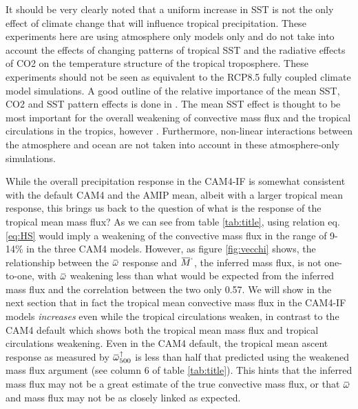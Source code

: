 \documentclass[letterpaper,12pt,titlepage,oneside,final]{book}
\newcommand{\overbar}[1]{\mkern 1.5mu\overline{\mkern-1.5mu#1\mkern-1.5mu}\mkern 1.5mu}
\begin{document}
It should be very clearly noted that a uniform increase in SST is not the only effect of climate change that will influence tropical precipitation. These experiments here are using atmosphere only models only and do not take into account the effects of changing patterns of tropical SST and the radiative effects of CO2 on the temperature structure of the tropical troposphere. These experiments should not be seen as equivalent to the RCP8.5 fully coupled climate model simulations. A good outline of the relative importance of the mean SST, CO2 and SST pattern effects is done in \citep{he_anthropogenic_2015}. The mean SST effect is thought to be most important for the overall weakening of convective mass flux and the tropical circulations in the tropics, however \citep{held_robust_2006,ma_mechanisms_2011,vecchi_global_2007,he_anthropogenic_2015}. Furthermore, non-linear interactions between the atmosphere and ocean are not taken into account in these atmosphere-only simulations.

While the overall precipitation response in the CAM4-IF is somewhat consistent with the default CAM4 and the AMIP mean, albeit with a larger tropical mean response, this brings us back to the question of what is the response of the tropical mean mass flux? As we can see from table \ref{tab:title}, using relation eq. \ref{eq:HS} would imply a weakening of the convective mass flux in the range of 9-14\% in the three CAM4 models. However, as figure \ref{fig:vecchi} shows, the relationship between the $\overbar{\omega}$ response and $\overbar{M}^{`}$, the inferred mass flux, is not one-to-one, with $\overbar{\omega}$ weakening less than what would be expected from the inferred mass flux and the correlation between the two only 0.57. We will show in the next section that in fact the tropical mean convective mass flux in the CAM4-IF models \textit{increases} even while the tropical circulations weaken, in contrast to the CAM4 default which shows both the tropical mean mass flux and tropical circulations weakening. Even in the CAM4 default, the tropical mean ascent response as measured by $\overbar{\omega}_{500}^{\uparrow}$ is less than half that predicted using the weakened mass flux argument (see column 6 of table \ref{tab:title}). This hints that the inferred mass flux may not be a great estimate of the true convective mass flux, or that $\overbar{\omega}$ and mass flux may not be as closely linked as expected.
\end{document}
